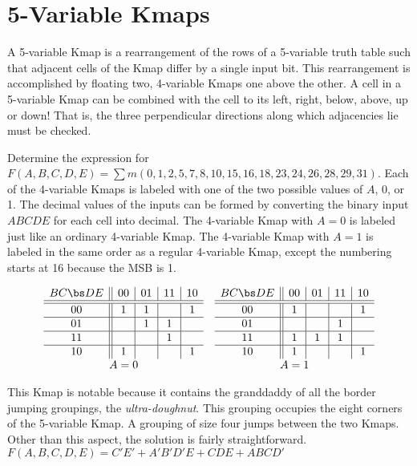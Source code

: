 \section{5-Variable Kmaps}
A 5-variable Kmap is a rearrangement of the rows of a 5-variable
truth table such that adjacent cells of the Kmap differ by a single
input bit.  This rearrangement is accomplished by floating two, 4-variable 
Kmaps one above the other.  A cell in a 5-variable Kmap can be combined with
the cell to its left, right, below, above, up or down!  That is, the three
perpendicular directions along which adjacencies lie must be checked.

Determine the \SOPmin expression for \\
$F(A,B,C,D,E) = \sum m(0,1,2,5,7,8,10,15,16,18,23,24,26,28,29,31)$.
Each of the 4-variable Kmaps is labeled with one of the two possible
values of $A$, 0, or 1.  The decimal values of the inputs can be formed
by converting the binary input $ABCDE$ for each cell into decimal.  The 
4-variable Kmap with $A=0$ is labeled just like an ordinary 4-variable 
Kmap.  The 4-variable Kmap with $A=1$ is labeled in the same order as a 
regular 4-variable Kmap, except the numbering starts at 16 because the MSB
is 1.

$$\begin{array}{cc} 
\begin{array} {c||c|c|c|c}
	BC \bs DE & 00 & 01 & 11 & 10 \\ \hline \hline
	00        & 1  & 1  &    & 1  \\ \hline
	01        &    & 1  & 1  &    \\ \hline
	11        &    &    & 1  &    \\ \hline
	10        & 1  &    &    & 1  \\ 
\end{array}
&
\begin{array} {c||c|c|c|c}
	BC \bs DE & 00 & 01 & 11 & 10 \\ \hline \hline
	00        & 1  &    &    & 1  \\ \hline
	01        &    &    & 1  &    \\ \hline
	11        & 1  & 1  & 1  &    \\ \hline
	10        & 1  &    &    & 1  \\ 
\end{array} \\
A=0 & A=1 \\
\end{array}
$$

This Kmap is notable because it contains the granddaddy of all the
border jumping groupings, the  \textit{ultra-doughnut}.  
This grouping occupies the eight corners of the 5-variable Kmap.  
A grouping of size four jumps between the two Kmaps.  
Other than this aspect, the solution is fairly straightforward.
$F(A,B,C,D,E)=C'E'+A'B'D'E+CDE+ABCD'$

